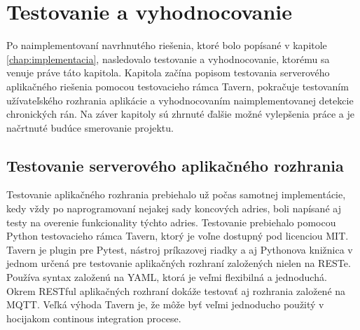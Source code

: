\chapter{Testovanie a vyhodnocovanie}
Po naimplementovaní navrhnutého riešenia, ktoré bolo popísané v kapitole \ref{chap:implementacia}, nasledovalo testovanie a vyhodnocovanie, ktorému sa venuje práve táto kapitola.  Kapitola začína popisom testovania serverového aplikačného riešenia pomocou testovacieho rámca Tavern, pokračuje testovaním užívateľského rozhrania aplikácie a vyhodnocovaním naimplementovanej detekcie chronických rán. Na záver kapitoly sú zhrnuté ďalšie možné vylepšenia práce a je načrtnuté budúce smerovanie projektu. 

\section{Testovanie serverového aplikačného rozhrania}
Testovanie aplikačného rozhrania prebiehalo už počas samotnej implementácie, kedy vždy po naprogramovaní nejakej sady koncových adries, boli napísané aj testy na overenie funkcionality týchto adries. Testovanie prebiehalo pomocou Python testovacieho rámca Tavern, ktorý je voľne dostupný pod licenciou MIT. Tavern je plugin pre Pytest, nástroj príkazovej riadky a aj Pythonova knižnica v jednom určená pre testovanie aplikačných rozhraní založených nielen na RESTe. Používa syntax založenú na YAML, ktorá je veľmi flexibilná a jednoduchá. Okrem RESTful aplikačných rozhraní dokáže testovať aj rozhrania založené na MQTT. Veľká výhoda Tavern je, že môže byť veľmi jednoducho použitý v hocijakom continous integration procese. \cite{AXUaooptJGOSpUrX} 

